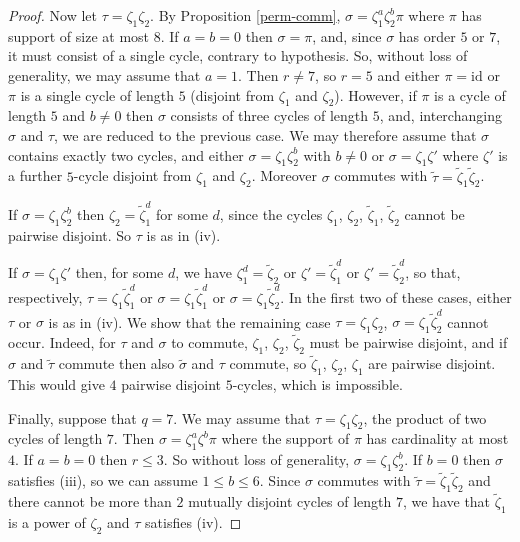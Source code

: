 \documentclass[letterpaper,12pt]{amsart}
\numberwithin{equation}{section}
\numberwithin{algorithm}{section}
\theoremstyle{definition}
\newcommand{\id}{\mathrm{id}}
\newcommand{\ttau}{\tilde{\tau}}
\newcommand{\tsigma}{\tilde{\sigma}}
\newcommand{\tzeta}{\tilde{\zeta}}
\begin{document}
\begin{proof}
Now let $\tau=\zeta_1 \zeta_2$. By Proposition \ref{perm-comm}, $\sigma = \zeta_1^a \zeta_2^b \pi$ where $\pi$ has support of size at most $8$. If $a=b=0$ then $\sigma=\pi$, and, since $\sigma$ has order $5$ or $7$, it must consist of a single cycle, contrary to hypothesis. So, without loss of generality, we may assume that $a=1$. Then $r \neq 7$, so $r=5$ and either $\pi=\id$ or $\pi$ is a single cycle of length $5$ (disjoint from $\zeta_1$ and $\zeta_2$). However, if $\pi$ is a cycle of length $5$ and $b \neq 0$ then $\sigma$ consists of three cycles of length $5$, and, interchanging $\sigma$ and $\tau$, we are reduced to the previous case. We may therefore assume that $\sigma$ contains exactly two cycles, and either $\sigma = \zeta_1 \zeta_2^b$ with $b \neq 0$ or $\sigma = \zeta_1 \zeta'$ where $\zeta'$ is a further $5$-cycle disjoint from $\zeta_1$ and $\zeta_2$. Moreover $\sigma$ commutes with $\ttau = \tzeta_1 \tzeta_2$.

If $\sigma = \zeta_1 \zeta_2^b$ then $\zeta_2=\tzeta_1^d$ for some $d$, since the cycles $\zeta_1$, $\zeta_2$, $\tzeta_1$, $\tzeta_2$ cannot be pairwise disjoint. So $\tau$ is as in (iv). 

If $\sigma = \zeta_1 \zeta'$ then, for some $d$, we have $\zeta_1^d=\tzeta_2$ or $\zeta'=\tzeta_1^d$ or $\zeta'=\tzeta_2^d$, so that, respectively, $\tau=\zeta_1 \tzeta_1^d$ or $\sigma=\zeta_1 \tzeta_1^d$ or 
$\sigma=\zeta_1 \tzeta_2^d$. In the first two of these cases, either $\tau$ or $\sigma$ is as in (iv). We show that the remaining case $\tau=\zeta_1 \zeta_2$, $\sigma=\zeta_1 \tzeta_2^d$ cannot occur. Indeed, for $\tau$ and $\sigma$ to commute, $\zeta_1$, $\zeta_2$, $\tzeta_2$ must be pairwise disjoint, and if $\sigma$ and $\ttau$ commute then also $\tsigma$ and $\tau$ commute, so $\tzeta_1$, $\zeta_2$, $\zeta_1$ are pairwise disjoint. This would give $4$ pairwise disjoint $5$-cycles, which is impossible.

Finally, suppose that $q=7$. We may assume that $\tau=\zeta_1 \zeta_2$, the product of two cycles of length $7$. Then $\sigma = \zeta_1^a \zeta^b \pi$ where the support of $\pi$ has cardinality at most $4$. If $a=b=0$ then $r \leq 3$. So without loss of generality, $\sigma=\zeta_1 \zeta_2^b$. If $b=0$ then $\sigma$ satisfies (iii), so 
we can assume $1 \leq b \leq 6$. Since $\sigma$ commutes with $\ttau = \tzeta_1 \tzeta_2$ and there cannot be more than $2$ mutually disjoint cycles of length $7$, we have that $\tzeta_1$ is a power of $\zeta_2$ and $\tau$ satisfies (iv).
\end{proof}
\end{document}
